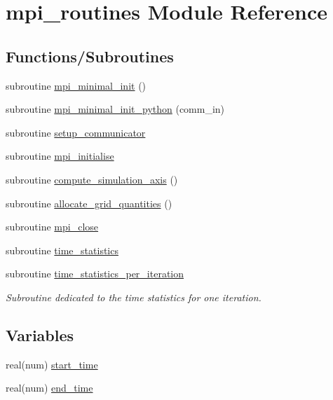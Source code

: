 \hypertarget{namespacempi__routines}{}\section{mpi\+\_\+routines Module Reference}
\label{namespacempi__routines}
\subsection*{Functions/\+Subroutines}
\begin{DoxyCompactItemize}
\item 
subroutine \hyperlink{namespacempi__routines_a61438ec53719149e70d0600171070933}{mpi\+\_\+minimal\+\_\+init} ()
\item 
subroutine \hyperlink{namespacempi__routines_a207f6d765479d24553ae1186200a5d9d}{mpi\+\_\+minimal\+\_\+init\+\_\+python} (comm\+\_\+in)
\item 
subroutine \hyperlink{namespacempi__routines_a32b858516b2e2b02580cf4ce8cb40ccc}{setup\+\_\+communicator}
\item 
subroutine \hyperlink{namespacempi__routines_a2574986e9474b6d4144f099df814e257}{mpi\+\_\+initialise}
\item 
subroutine \hyperlink{namespacempi__routines_ac6bf7d666673e87855069981a4a664d5}{compute\+\_\+simulation\+\_\+axis} ()
\item 
subroutine \hyperlink{namespacempi__routines_a483f086b039961c1b48127fc9d81cf65}{allocate\+\_\+grid\+\_\+quantities} ()
\item 
subroutine \hyperlink{namespacempi__routines_ab1a2d976a5017905d06e301f5af07ad2}{mpi\+\_\+close}
\item 
subroutine \hyperlink{namespacempi__routines_a39928834ab9f9c980ffc2e7849cf8af3}{time\+\_\+statistics}
\item 
subroutine \hyperlink{namespacempi__routines_aae81751f0f074a5eba4ddc0126bfd5cd}{time\+\_\+statistics\+\_\+per\+\_\+iteration}
\begin{DoxyCompactList}\small\item\em Subroutine dedicated to the time statistics for one iteration. \end{DoxyCompactList}\end{DoxyCompactItemize}
\subsection*{Variables}
\begin{DoxyCompactItemize}
\item 
real(num) \hyperlink{namespacempi__routines_aa3f567f6443fe088b81d3fb43509a45c}{start\+\_\+time}
\item 
real(num) \hyperlink{namespacempi__routines_a4b0b516f93006e24d942b3f124cb82d4}{end\+\_\+time}
\end{DoxyCompactItemize}


